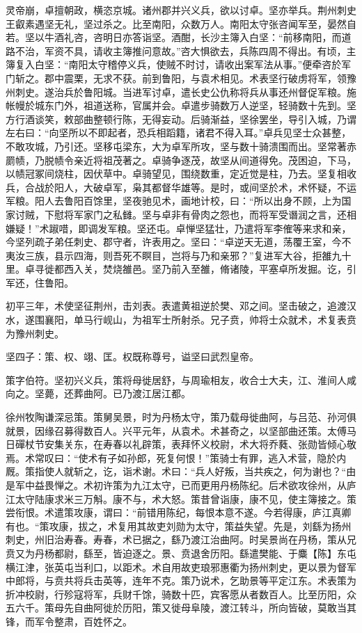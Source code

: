 \documentclass[12pt,UTF8]{ctexbook}
\begin{document}
灵帝崩，卓擅朝政，横恣京城。诸州郡并兴义兵，欲以讨卓。坚亦举兵。荆州刺史王叡素遇坚无礼，坚过杀之。比至南阳，众数万人。南阳太守张咨闻军至，晏然自若。坚以牛酒礼咨，咨明日亦答诣坚。酒酣，长沙主簿入白坚：“前移南阳，而道路不治，军资不具，请收主簿推问意故。”咨大惧欲去，兵陈四周不得出。有顷，主簿复入白坚：“南阳太守稽停义兵，使贼不时讨，请收出案军法从事。”便牵咨於军门斩之。郡中震栗，无求不获。前到鲁阳，与袁术相见。术表坚行破虏将军，领豫州刺史。遂治兵於鲁阳城。当进军讨卓，遣长史公仇称将兵从事还州督促军粮。施帐幔於城东门外，祖道送称，官属并会。卓遣步骑数万人逆坚，轻骑数十先到。坚方行酒谈笑，敕部曲整顿行陈，无得妄动。后骑渐益，坚徐罢坐，导引入城，乃谓左右曰：“向坚所以不即起者，恐兵相蹈籍，诸君不得入耳。”卓兵见坚士众甚整，不敢攻城，乃引还。坚移屯梁东，大为卓军所攻，坚与数十骑溃围而出。坚常著赤罽帻，乃脱帻令亲近将祖茂著之。卓骑争逐茂，故坚从间道得免。茂困迫，下马，以帻冠冢间烧柱，因伏草中。卓骑望见，围绕数重，定近觉是柱，乃去。坚复相收兵，合战於阳人，大破卓军，枭其都督华雄等。是时，或间坚於术，术怀疑，不运军粮。阳人去鲁阳百馀里，坚夜驰见术，画地计校，曰：“所以出身不顾，上为国家讨贼，下慰将军家门之私雠。坚与卓非有骨肉之怨也，而将军受谮润之言，还相嫌疑！”术踧唶，即调发军粮。坚还屯。卓惮坚猛壮，乃遣将军李傕等来求和亲，今坚列疏子弟任刺史、郡守者，许表用之。坚曰：“卓逆天无道，荡覆王室，今不夷汝三族，县示四海，则吾死不瞑目，岂将与乃和亲邪？”复进军大谷，拒雒九十里。卓寻徙都西入关，焚烧雒邑。坚乃前入至雒，脩诸陵，平塞卓所发掘。讫，引军还，住鲁阳。

初平三年，术使坚征荆州，击刘表。表遣黄祖逆於樊、邓之间。坚击破之，追渡汉水，遂围襄阳，单马行岘山，为祖军士所射杀。兄子贲，帅将士众就术，术复表贲为豫州刺史。

坚四子：策、权、翊、匡。权既称尊号，谥坚曰武烈皇帝。

策字伯符。坚初兴义兵，策将母徙居舒，与周瑜相友，收合士大夫，江、淮间人咸向之。坚薨，还葬曲阿。已乃渡江居江都。

徐州牧陶谦深忌策。策舅吴景，时为丹杨太守，策乃载母徙曲阿，与吕范、孙河俱就景，因缘召募得数百人。兴平元年，从袁术。术甚奇之，以坚部曲还策。太傅马日磾杖节安集关东，在寿春以礼辟策，表拜怀义校尉，术大将乔蕤、张勋皆倾心敬焉。术常叹曰：“使术有子如孙郎，死复何恨！”策骑士有罪，逃入术营，隐於内厩。策指使人就斩之，讫，诣术谢。术曰：“兵人好叛，当共疾之，何为谢也？“由是军中益畏惮之。术初许策为九江太守，已而更用丹杨陈纪。后术欲攻徐州，从庐江太守陆康求米三万斛。康不与，术大怒。策昔曾诣康，康不见，使主簿接之。策尝衔恨。术遣策攻康，谓曰：“前错用陈纪，每恨本意不遂。今若得康，庐江真卿有也。“策攻康，拔之，术复用其故吏刘勋为太守，策益失望。先是，刘繇为扬州刺史，州旧治寿春。寿春，术已据之，繇乃渡江治曲阿。时吴景尚在丹杨，策从兄贲又为丹杨都尉，繇至，皆迫逐之。景、贲退舍历阳。繇遣樊能、于麋【陈】东屯横江津，张英屯当利口，以距术。术自用故吏琅邪惠衢为扬州刺史，更以景为督军中郎将，与贲共将兵击英等，连年不克。策乃说术，乞助景等平定江东。术表策为折冲校尉，行殄寇将军，兵财千馀，骑数十匹，宾客愿从者数百人。比至历阳，众五六千。策母先自曲阿徙於历阳，策又徙母阜陵，渡江转斗，所向皆破，莫敢当其锋，而军令整肃，百姓怀之。
\end{document}
